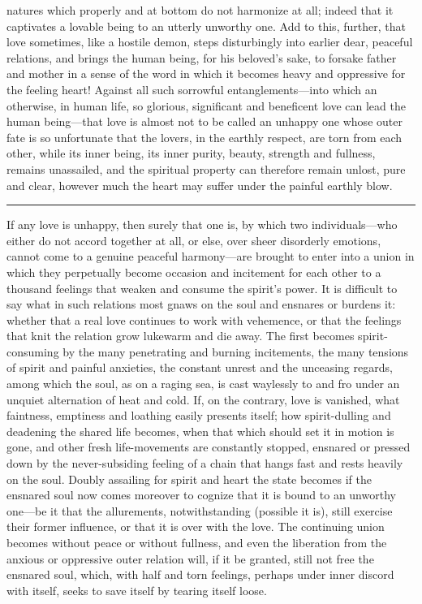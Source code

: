 \documentclass[12pt,a4paper]{book}
\begin{document}
natures which properly and at bottom do not harmonize at all; indeed that
it captivates a lovable being to an utterly unworthy one. Add to this,
further, that love sometimes, like a hostile demon, steps disturbingly into
earlier dear, peaceful relations, and brings the human being, for his
beloved's sake, to forsake father and mother in a sense of the word in
which it becomes heavy and oppressive for the feeling heart! Against all
such sorrowful entanglements---into which an otherwise, in human life, so
glorious, significant and beneficent love can lead the human being---that
love is almost not to be called an unhappy one whose outer fate is so
unfortunate that the lovers, in the earthly respect, are torn from each
other, while its inner being, its inner purity, beauty, strength and
fullness, remains unassailed, and the spiritual property can therefore
remain unlost, pure and clear, however much the heart may suffer under the
painful earthly blow.

\begin{center}\rule{0.28\linewidth}{0.4pt}\end{center}

If any love is unhappy, then surely that one is, by which two
individuals---who either do not accord together at all, or else, over sheer
disorderly emotions, cannot come to a genuine peaceful harmony---are
brought to enter into a union in which they perpetually become occasion and
incitement for each other to a thousand feelings that weaken and consume
the spirit's power. It is difficult to say what in such relations most
gnaws on the soul and ensnares or burdens it: whether that a real love
continues to work with vehemence, or that the feelings that knit the
relation grow lukewarm and die away. The first becomes spirit-consuming by
the many penetrating and burning incitements, the many tensions of spirit
and painful anxieties, the constant unrest and the unceasing regards, among
which the soul, as on a raging sea, is cast waylessly to and fro under an
unquiet alternation of heat and cold. If, on the contrary, love is
vanished, what faintness, emptiness and loathing easily presents itself;
how spirit-dulling and deadening the shared life becomes, when that which
should set it in motion is gone, and other fresh life-movements are
constantly stopped, ensnared or pressed down by the never-subsiding feeling
of a chain that hangs fast and rests heavily on the soul. Doubly assailing
for spirit and heart the state becomes if the ensnared soul now comes
moreover to cognize that it is bound to an unworthy one---be it that the
allurements, notwithstanding (possible it is), still exercise their former
influence, or that it is over with the love. The continuing union becomes
without peace or without fullness, and even the liberation from the anxious
or oppressive outer relation will, if it be granted, still not free the
ensnared soul, which, with half and torn feelings, perhaps under inner
discord with itself, seeks to save itself by tearing itself loose.
\end{document}
